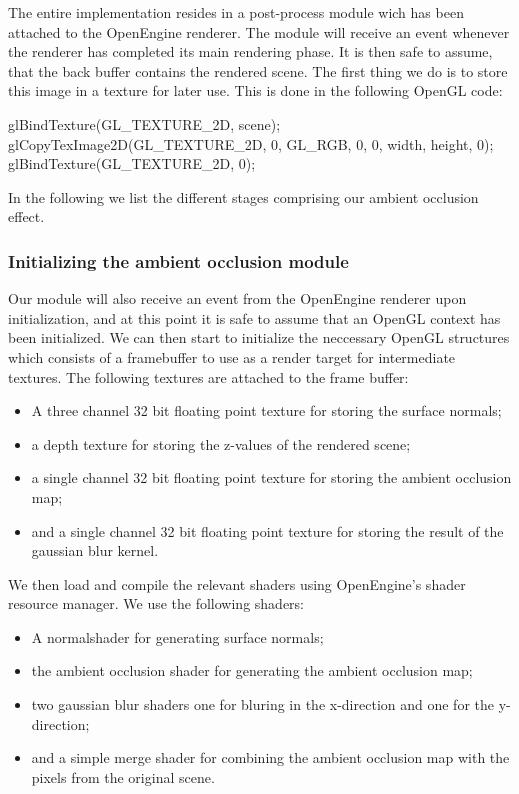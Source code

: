The entire implementation resides in a post-process module wich has
been attached to the OpenEngine renderer. The module will receive an
event whenever the renderer has completed its main rendering phase. It
is then safe to assume, that the back buffer contains the rendered
scene.  The first thing we do is to store this image in a texture for
later use. This is done in the following OpenGL code:
\begin{cppcode}
  glBindTexture(GL_TEXTURE_2D, scene);
  glCopyTexImage2D(GL_TEXTURE_2D, 0, GL_RGB, 0, 0, width, height, 0);
  glBindTexture(GL_TEXTURE_2D, 0);
\end{cppcode}

In the following we list the different stages comprising our ambient
occlusion effect.

\subsubsection*{Initializing the ambient occlusion module}
Our module will also receive an event from the OpenEngine renderer
upon initialization, and at this point it is safe to assume that
an OpenGL context has been initialized. We can then start to
initialize the neccessary OpenGL structures which consists of a
framebuffer to use as a render target for intermediate textures. The
following textures are attached to the frame buffer:
\begin{itemize}
\item A three channel 32 bit floating point texture for storing the
  surface normals;
\item a depth texture for storing the z-values of the rendered scene;
\item a single channel 32 bit floating point texture for storing the
  ambient occlusion map;
  \item and a single channel 32 bit floating point texture for storing the
  result of the gaussian blur kernel.
\end{itemize}
We then load and compile the relevant shaders using OpenEngine's
shader resource manager. We use the following shaders:
\begin{itemize}
\item A normalshader for generating surface normals;
\item the ambient occlusion shader for generating the ambient
  occlusion map;
\item two gaussian blur shaders one for bluring in the x-direction and
  one for the y-direction;
\item and a simple merge shader for combining the ambient occlusion
  map with the pixels from the original scene.
\end{itemize}

